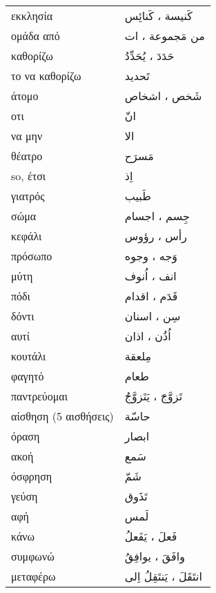 \documentclass[twocolumn,a4paper]{article}
\newcommand{\ar}[1]{\textarabic{#1}}
\newcommand{\pl}{\raisebox{0.15ex}{\footnotesize ◍}}
\newcommand{\normpl}[1]{\ar{ #1، ات }}
\newcommand{\vrf}{\raisebox{0.15ex}{\footnotesize ◉}}
\newcommand{\mas}{\raisebox{0.15ex}{\footnotesize ◫}}
\begin{document}
\begin{mpsupertabular}{ P{0.5\textwidth} P{0.5\textwidth} }
εκκλησία \pl                 & \ar{ كَنيسة ، كَنائِس } \\
ομάδα από \pl                & \ar{من} \normpl{ مَجموعة } \\
καθορίζω \vrf                & \ar{ حَدَدَ ، يُحَدِّدُ } \\
το να καθορίζω \mas          & \ar{ تَحديد } \\
άτομο \pl                    & \ar{ شَخص ، اشخاص } \\
οτι                          & \ar{ انّ } \\
να μην                       & \ar{ الا } \\
θέατρο                       & \ar{ مَسرَح } \\
so, έτσι                     & \ar{ اِذ } \\
γιατρός                      & \ar{ طَبيب } \\
σώμα \pl                     & \ar{ جِسم ، اجسام } \\
κεφάλι \pl                   & \ar{ رأس ، رؤوس } \\
πρόσωπο \pl                  & \ar{ وَجه ، وجوه } \\
μύτη \pl                     & \ar{ انف ، اُنوف } \\
πόδι \pl                     & \ar{ قَدَم ، اقدام } \\
δόντι \pl                    & \ar{ سِن ، اسنان } \\
αυτί \pl                     & \ar{ اُذُن ، اذان } \\
κουτάλι                      & \ar{ مِلعقة } \\
φαγητό                       & \ar{ طعام } \\
παντρεύομαι \vrf             & \ar{ تَزوَّجَ ، يَتَزوَّجُ } \\
αίσθηση (5 αισθήσεις)        & \ar{ حاسّة } \\
όραση                        & \ar{ ابصار } \\
ακοή                         & \ar{ سَمع } \\
όσφρηση                      & \ar{ شَمّ } \\
γεύση                        & \ar{ تَذَوق } \\
αφή                          & \ar{ لَمس } \\
κάνω \vrf                    & \ar{ فَعلَ ، يَفَعلُ } \\
συμφωνώ \vrf                 & \ar{ وافَقَ ، يوافِقُ } \\
μεταφέρω \vrf                & \ar{ انتَقَلَ ، يَنتَقِلُ اِلى} \\

\end{mpsupertabular}
\end{document}
